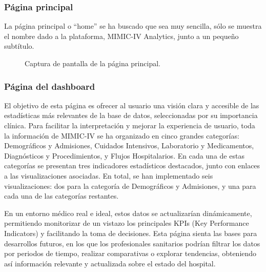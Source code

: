 \subsubsection{Página principal}

La página principal o ``home'' se ha buscado que sea muy sencilla, sólo se muestra el nombre dado a la plataforma, MIMIC-IV Analytics, junto a un pequeño subtítulo. 


\begin{figure}[H]
  \centering
  \caption{Captura de pantalla de la página principal.}
  \label{fig:home}
\end{figure}


\subsubsection{Página del dashboard}

El objetivo de esta página es ofrecer al usuario una visión clara y accesible de las estadísticas más relevantes de la base de datos, seleccionadas por su importancia clínica. Para facilitar la interpretación y mejorar la experiencia de usuario, toda la información de MIMIC-IV se ha organizado en cinco grandes categorías: Demográficos y Admisiones, Cuidados Intensivos, Laboratorio y Medicamentos, Diagnósticos y Procedimientos, y Flujos Hospitalarios. En cada una de estas categorías se presentan tres indicadores estadísticos destacados, junto con enlaces a las visualizaciones asociadas. En total, se han implementado seis visualizaciones: dos para la categoría de Demográficos y Admisiones, y una para cada una de las categorías restantes.

En un entorno médico real e ideal, estos datos se actualizarían dinámicamente, permitiendo monitorizar de un vistazo los principales KPIs (Key Performance Indicators) y facilitando la toma de decisiones. Esta página sienta las bases para desarrollos futuros, en los que los profesionales sanitarios podrían filtrar los datos por periodos de tiempo, realizar comparativas o explorar tendencias, obteniendo así información relevante y actualizada sobre el estado del hospital. 


